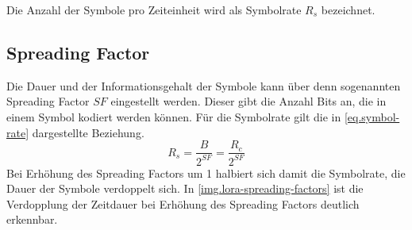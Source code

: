 Die Anzahl der Symbole pro Zeiteinheit wird als Symbolrate $R_s$ bezeichnet.


\subsection{Spreading Factor}
Die Dauer und der Informationsgehalt der Symbole kann über denn sogenannten Spreading Factor $SF$ eingestellt werden.
Dieser gibt die Anzahl Bits an, die in einem Symbol kodiert werden können.
Für die Symbolrate gilt die in \autoref{eq.symbol-rate} dargestellte Beziehung.
\cite[S. 10]{loramodulation}
\begin{equation}
	R_s = \frac{B}{2^{SF}} = \frac{R_c}{2^{SF}}
	\label{eq.symbol-rate}
\end{equation}
Bei Erhöhung des Spreading Factors um 1 halbiert sich damit die Symbolrate, die Dauer der Symbole verdoppelt sich.
In \autoref{img.lora-spreading-factors} ist die Verdopplung der Zeitdauer bei Erhöhung des Spreading Factors deutlich erkennbar.


